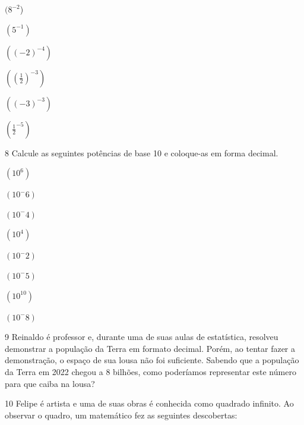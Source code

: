 \begin{escolha}
\item $(8^{-2}$) 
\item $(5^{-1})$ 
\item $((-2)^{-4}) $
\item $((\frac{1}{2})^{-3}) $
\item $((-3)^{-3}) $
\item $(\frac{1}{2}^{-5}) $
\end{escolha}


\num{8} Calcule as seguintes potências de base 10 e coloque-as em forma
decimal.

\begin{escolha}
\item $(10^6)$
\item $(10^-6)$
\item $(10^-4)$
\item $(10^4)$
\item $(10^-2)$
\item $(10 ^-5)$
\item $(10^10)$
\item $(10^-8)$
\end{escolha}

\num{9} Reinaldo é professor e, durante uma de suas aulas de estatística,
resolveu demonstrar a população da Terra em formato decimal. Porém, ao
tentar fazer a demonstração, o espaço de sua lousa não foi suficiente.
Sabendo que a população da Terra em 2022 chegou a 8 bilhões, como
poderíamos representar este número para que caiba na lousa?


\num{10} Felipe é artista e uma de suas obras é conhecida como quadrado
infinito. Ao observar o quadro, um matemático fez as seguintes
descobertas:

